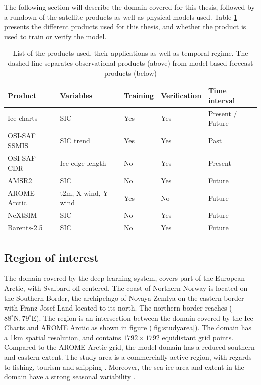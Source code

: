 \documentclass[../main/thesis.tex]{subfiles}
\begin{document}
The following section will describe the domain covered for this thesis, followed by a rundown of the satellite products as well as physical models used. Table \ref{tab:data_overview} presents the different products used for this thesis, and whether the product is used to train or verify the model.

\begin{table}
    \caption{\label{tab:data_overview}List of the products used, their applications as well as temporal regime. The dashed line separates observational products (above) from model-based forecast products (below)}
    \centering
    \setlength{\arrayrulewidth}{0.5mm}
    \renewcommand{\arraystretch}{1.3}
    \begin{tabular}{lllll}
    \hline
    Product             & Variables           & Training & Verification & Time interval\\
    \hline
    Ice charts          & SIC                 & Yes      & Yes & Present / Future         \\
    OSI-SAF SSMIS       & SIC trend           & Yes      & Yes & Past          \\
    OSI-SAF CDR         & Ice edge length     & No       & Yes & Present         \\
    AMSR2               & SIC                 & No       & Yes & Future         \\
    \hdashline
    AROME Arctic        & t2m, X-wind, Y-wind & Yes      & No  & Future         \\
    NeXtSIM             & SIC                 & No       & Yes & Future         \\
    Barents-2.5         & SIC                 & No       & Yes & Future         \\
    \hline         
    \end{tabular}
\end{table}


\subsection{Region of interest}
\label{sec:roi}
The domain covered by the deep learning system, covers part of the European Arctic, with Svalbard off-centered. The coast of Northern-Norway is located on the Southern Border, the archipelago of Novaya Zemlya on the eastern border with Franz Josef Land located to its north. The northern border reaches ($88^\circ \text{N}, 79^\circ \text{E})$. The region is an intersection between the domain covered by the Ice Charts \citep{Dinessen2020} and AROME Arctic \citep{Mueller2017} as shown in figure (\ref{fig:studyarea}). The domain has a 1km spatial resolution, and contains $1792 \times 1792$ equidistant grid points. Compared to the AROME Arctic grid, the model domain has a reduced southern and eastern extent. The study area is a commercially active region, with regards to fishing, tourism and shipping \citep{Wagner2020}. Moreover, the sea ice area and extent in the domain have a strong seasonal variability \citep{Cavalieri2012}.
\end{document}
